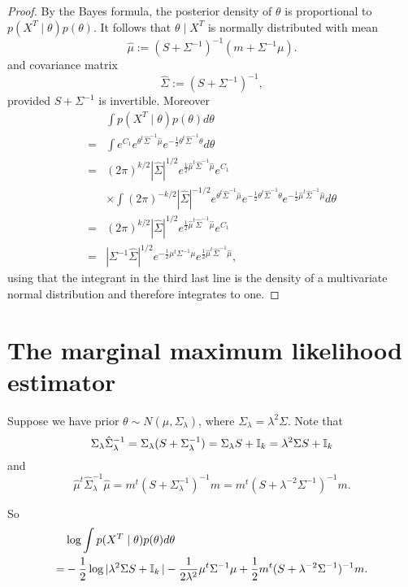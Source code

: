 \documentclass[12pt]{article}
\begin{document}
\begin{proof}
By the Bayes formula, the posterior density of \(\theta\) is proportional to \(p(X^T\mid\theta)p(\theta)\). It follows that  \(\theta\mid X^T\) is normally distributed with mean 
\[\hat\mu :=( S + \Sigma^{-1} )^{-1} (m + \Sigma^{-1}\mu).\]
 and covariance matrix \[\hat\Sigma:=(S+\Sigma^{-1})^{-1},\]
provided $S+\Sigma^{-1}$ is invertible.  
 Moreover 
 \begin{align*}
 &\int  p(X^T\mid\theta)p(\theta)d\theta \\
 = & \int  e^{C_1} e^{\theta^t\hat\Sigma^{-1}\hat\mu } e^{-\frac12\theta^t \hat\Sigma^{-1} \theta} d\theta\\
 = & (2\pi)^{k/2}| \hat\Sigma|^{1/2}e^{\frac12\hat\mu^t\hat\Sigma^{-1}\hat\mu}e^{C_1}\\
 &\times \int (2\pi)^{-k/2}|\hat\Sigma|^{-1/2}e^{\theta^t\hat\Sigma^{-1}\hat\mu } e^{-\frac12\theta^t \hat\Sigma^{-1} \theta} e^{-\frac12\hat\mu^t\hat\Sigma^{-1}\hat\mu}d\theta\\
 = & (2\pi)^{k/2}|\hat\Sigma|^{1/2}e^{\frac12\hat\mu^t\hat\Sigma^{-1}\hat\mu}e^{C_1}\\
 = & |\Sigma^{-1}\hat\Sigma|^{1/2}e^{-\frac12\mu^t\Sigma^{-1}\mu} e^{\frac12\hat\mu^t\hat\Sigma^{-1}\hat\mu},
 \end{align*}
 using that the integrant in the third last line is the density of a multivariate normal distribution and therefore integrates to one.
\end{proof}

\section{The marginal maximum likelihood estimator}

Suppose we have prior \(\theta\sim N(\mu,\Sigma_\lambda)\), where \(\Sigma_\lambda=\lambda^2\Sigma \). Note that 
  \[
\Sigma_\lambda \hat \Sigma_\lambda ^{-1} = \Sigma_\lambda (S+\Sigma_\lambda ^{-1})= \Sigma_\lambda  S + \operatorname{\mathbb{I}}_k=\lambda^2\Sigma  S + \operatorname{\mathbb{I}}_k
\]
and\[
\hat \mu^t \hat\Sigma_\lambda^{-1} \hat\mu = m^t (S+\Sigma_\lambda^{-1})^{-1}m= m^t (S+\lambda^{-2}\Sigma^{-1})^{-1}m. 
\]

So 
\begin{equation}\label{eq:marginallikelihood}
\begin{split}
&\log \int  p(X^T\mid\theta)p(\theta)d\theta \\
= & -\frac12\log|\lambda^2 \Sigma S + \operatorname{\mathbb{I}}_k| -\frac1{2\lambda^2}\mu^t\Sigma^{-1}\mu    + \frac12 m^t (S+\lambda^{-2}\Sigma^{-1})^{-1}m. 
\end{split}
\end{equation}
\end{document}
